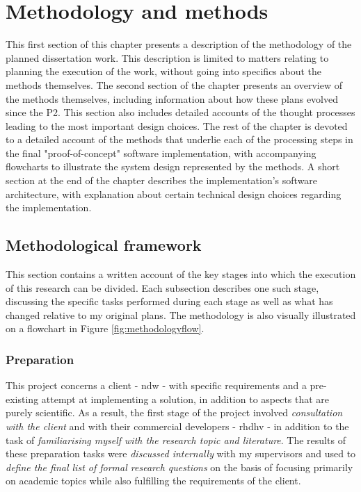 
\chapter{Methodology and methods}
\label{chap:mm}

This first section of this chapter presents a description of the methodology of the planned dissertation work. This description is limited to matters relating to planning the execution of the work, without going into specifics about the methods themselves. The second section of the chapter presents an overview of the methods themselves, including information about how these plans evolved since the P2. This section also includes detailed accounts of the thought processes leading to the most important design choices. The rest of the chapter is devoted to a detailed account of the methods that underlie each of the processing steps in the final "proof-of-concept" software implementation, with accompanying flowcharts to illustrate the system design represented by the methods. A short section at the end of the chapter describes the implementation's software architecture, with explanation about certain technical design choices regarding the implementation.

\section{Methodological framework}
\label{sec:methodology}

This section contains a written account of the key stages into which the execution of this research can be divided. Each subsection describes one such stage, discussing the specific tasks performed during each stage as well as what has changed relative to my original plans. The methodology is also visually illustrated on a flowchart in Figure \ref{fig:methodologyflow}.

\subsection{Preparation}
\label{sub:preparation}

This project concerns a client - \ac{ndw} - with specific requirements and a pre-existing attempt at implementing a solution, in addition to aspects that are purely scientific. As a result, the first stage of the project involved \textit{consultation with the client} and with their commercial developers - \ac{rhdhv} - in addition to the task of \textit{familiarising myself with the research topic and literature}. The results of these preparation tasks were \textit{discussed internally} with my supervisors and used to \textit{define the final list of formal research questions} on the basis of focusing primarily on academic topics while also fulfilling the requirements of the client.

